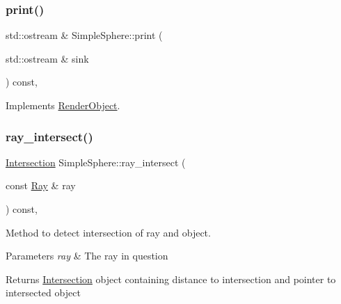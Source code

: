 \mbox{\label{classSimpleSphere_a2da3c9e41a8d8e6ec4012343ea0fa793}} 
\subsubsection{\texorpdfstring{print()}{print()}}
{\footnotesize\ttfamily std\+::ostream \& Simple\+Sphere\+::print (\begin{DoxyParamCaption}\item[{std\+::ostream \&}]{sink }\end{DoxyParamCaption}) const\hspace{0.3cm}{\ttfamily [override]}, {\ttfamily [virtual]}}



Implements \mbox{\hyperlink{classRenderObject_a7a7f1168a7d96ca95235b170ff7fb11b}{Render\+Object}}.

\mbox{\label{classSimpleSphere_abb50f169da7cb2acab05c8f9d56cd1e8}} 
\subsubsection{\texorpdfstring{ray\_intersect()}{ray\_intersect()}}
{\footnotesize\ttfamily \mbox{\hyperlink{classIntersection}{Intersection}} Simple\+Sphere\+::ray\+\_\+intersect (\begin{DoxyParamCaption}\item[{const \mbox{\hyperlink{classRay}{Ray}} \&}]{ray }\end{DoxyParamCaption}) const\hspace{0.3cm}{\ttfamily [override]}, {\ttfamily [virtual]}}



Method to detect intersection of ray and object. 


\begin{DoxyParams}{Parameters}
{\em ray} & The ray in question \\
\hline
\end{DoxyParams}
\begin{DoxyReturn}{Returns}
\mbox{\hyperlink{classIntersection}{Intersection}} object containing distance to intersection and pointer to intersected object 
\end{DoxyReturn}


